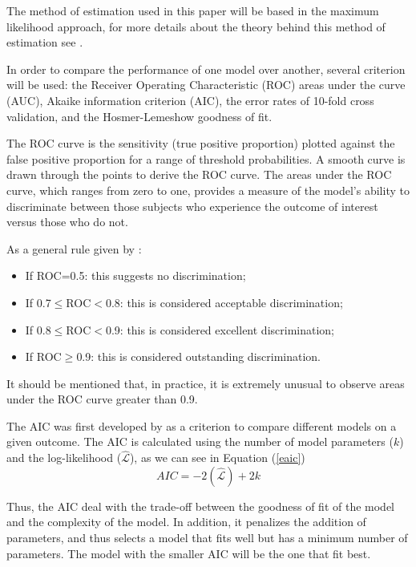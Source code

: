\documentclass{asaproc}
\begin{document}
The method of estimation used in this paper will be based in the maximum likelihood approach, for more details about the theory behind this method of estimation see \cite{hosmer1954applied}.

In order to compare the performance of one model over another, several criterion will be used: the Receiver Operating Characteristic (ROC) areas under the curve (AUC), Akaike information criterion (AIC), the error rates of 10-fold cross validation, and the Hosmer-Lemeshow goodness of fit.  

The ROC curve is the sensitivity (true positive proportion) plotted against the false positive proportion for a range of threshold probabilities. A smooth curve is drawn through the points to derive the ROC curve. The areas under the ROC curve, which ranges from zero to one, provides a measure of the model's ability to discriminate between those subjects who experience the outcome of interest versus those who do not. \citep{hosmer1954applied}

As a general rule given by \cite{hosmer1954applied}:
\begin{itemize}
    \item If ROC=0.5: this suggests no discrimination;
    \item If 0.7$\leq$ROC$<$0.8: this is considered acceptable discrimination;
    \item If 0.8$\leq$ROC$<$0.9: this is considered excellent discrimination;
    \item If ROC$\geq$0.9: this is considered outstanding discrimination.
\end{itemize}

It should be mentioned that, in practice, it is extremely unusual to observe areas under the ROC curve greater than 0.9.

The AIC was first developed by \cite{akaike1992information} as a criterion to compare different models on a given outcome. The AIC is calculated using the number of model parameters ($k$) and the log-likelihood ($\hat{\mathcal{L}}$), as we can see in Equation (\ref{eaic})
\begin{equation}
    AIC = -2(\hat{\mathcal{L}}) + 2k
    \label{eaic}
\end{equation}

Thus, the AIC deal with the trade-off between the goodness of fit of the model and the complexity of the model. In addition, it penalizes the addition of parameters, and thus selects a model that fits well but has a minimum number of parameters. The model with the smaller AIC will be the one that fit best.
\end{document}
